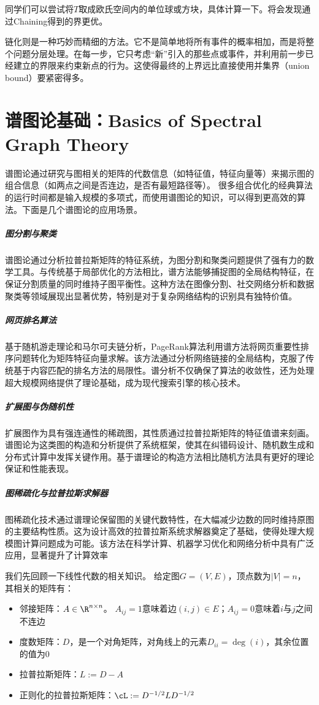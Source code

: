 \documentclass[lang=cn,newtx,10pt,scheme=chinese,chinesefont=nofont,citestyle=gb7714-2015, bibstyle=gb7714-2015]{elegantbook}
\begin{document}
\begin{refsection}
同学们可以尝试将$T$取成欧氏空间内的单位球或方块，具体计算一下。将会发现通过Chaining得到的界更优\cite{jelani2016}。

链化则是一种巧妙而精细的方法。它不是简单地将所有事件的概率相加，而是将整个问题分层处理。在每一步，它只考虑“新”引入的那些点或事件，并利用前一步已经建立的界限来约束新点的行为。这使得最终的上界远比直接使用并集界（union bound）要紧密得多。


\section{谱图论基础：Basics of Spectral Graph Theory}


谱图论通过研究与图相关的矩阵的代数信息（如特征值，特征向量等）来揭示图的组合信息（如两点之间是否连边，是否有最短路径等）。
很多组合优化的经典算法的运行时间都是输入规模的多项式，而使用谱图论的知识，可以得到更高效的算法。下面是几个谱图论的应用场景。

\subparagraph{图分割与聚类}
谱图论通过分析拉普拉斯矩阵的特征系统，为图分割和聚类问题提供了强有力的数学工具。与传统基于局部优化的方法相比，谱方法能够捕捉图的全局结构特征，在保证分割质量的同时维持子图平衡性。这种方法在图像分割、社交网络分析和数据聚类等领域展现出显著优势，特别是对于复杂网络结构的识别具有独特价值。

\subparagraph{网页排名算法}
基于随机游走理论和马尔可夫链分析，PageRank算法利用谱方法将网页重要性排序问题转化为矩阵特征向量求解。该方法通过分析网络链接的全局结构，克服了传统基于内容匹配的排名方法的局限性。谱分析不仅确保了算法的收敛性，还为处理超大规模网络提供了理论基础，成为现代搜索引擎的核心技术。

\subparagraph{扩展图与伪随机性}
扩展图作为具有强连通性的稀疏图，其性质通过拉普拉斯矩阵的特征值谱来刻画。谱图论为这类图的构造和分析提供了系统框架，使其在纠错码设计、随机数生成和分布式计算中发挥关键作用。基于谱理论的构造方法相比随机方法具有更好的理论保证和性能表现。

\subparagraph{图稀疏化与拉普拉斯求解器}
图稀疏化技术通过谱理论保留图的关键代数特性，在大幅减少边数的同时维持原图的主要结构性质。这为设计高效的拉普拉斯系统求解器奠定了基础，使得处理大规模图计算问题成为可能。该方法在科学计算、机器学习优化和网络分析中具有广泛应用，显著提升了计算效率

\bigskip

我们先回顾一下线性代数的相关知识。
给定图$G=(V,E)$，顶点数为$|V|=n$，其相关的矩阵有：
\begin{itemize}
    \item 邻接矩阵：$A\in\R^{n\times n}$。
    $A_{ij}=1$意味着边$(i,j)\in E$；$A_{ij}=0$意味着$i$与$j$之间不连边
    \item 度数矩阵：$D$，是一个对角矩阵，对角线上的元素$D_{ii}=\deg(i)$，其余位置的值为0
    \item 拉普拉斯矩阵：$L:=D-A$
    \item 正则化的拉普拉斯矩阵：$\cL:=D^{-1/2}LD^{-1/2}$
\end{itemize}


\end{refsection}
\end{document}
